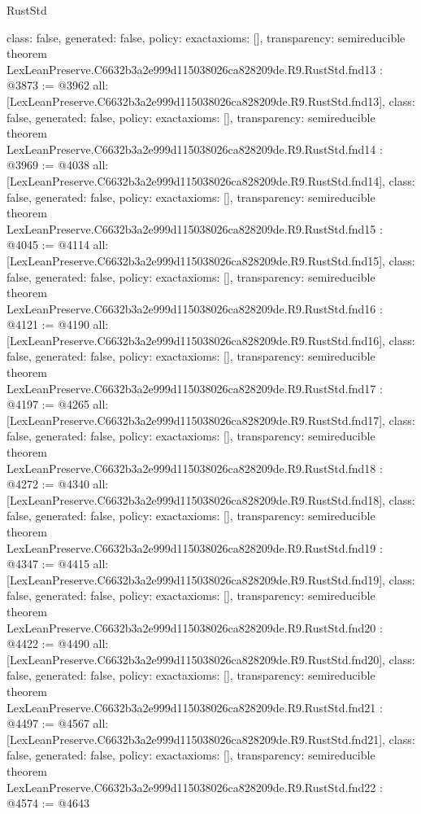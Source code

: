 \begin{lexlean}{RustStd}
\begin{coremodule}
{  class: false,
  generated: false,
  policy: exact{axioms: []},
  transparency: semireducible
}
theorem LexLeanPreserve.C6632b3a2e999d115038026ca828209de.R9.RustStd.fnd13 : @3873 := @3962 {
  all: [LexLeanPreserve.C6632b3a2e999d115038026ca828209de.R9.RustStd.fnd13],
  class: false,
  generated: false,
  policy: exact{axioms: []},
  transparency: semireducible
}
theorem LexLeanPreserve.C6632b3a2e999d115038026ca828209de.R9.RustStd.fnd14 : @3969 := @4038 {
  all: [LexLeanPreserve.C6632b3a2e999d115038026ca828209de.R9.RustStd.fnd14],
  class: false,
  generated: false,
  policy: exact{axioms: []},
  transparency: semireducible
}
theorem LexLeanPreserve.C6632b3a2e999d115038026ca828209de.R9.RustStd.fnd15 : @4045 := @4114 {
  all: [LexLeanPreserve.C6632b3a2e999d115038026ca828209de.R9.RustStd.fnd15],
  class: false,
  generated: false,
  policy: exact{axioms: []},
  transparency: semireducible
}
theorem LexLeanPreserve.C6632b3a2e999d115038026ca828209de.R9.RustStd.fnd16 : @4121 := @4190 {
  all: [LexLeanPreserve.C6632b3a2e999d115038026ca828209de.R9.RustStd.fnd16],
  class: false,
  generated: false,
  policy: exact{axioms: []},
  transparency: semireducible
}
theorem LexLeanPreserve.C6632b3a2e999d115038026ca828209de.R9.RustStd.fnd17 : @4197 := @4265 {
  all: [LexLeanPreserve.C6632b3a2e999d115038026ca828209de.R9.RustStd.fnd17],
  class: false,
  generated: false,
  policy: exact{axioms: []},
  transparency: semireducible
}
theorem LexLeanPreserve.C6632b3a2e999d115038026ca828209de.R9.RustStd.fnd18 : @4272 := @4340 {
  all: [LexLeanPreserve.C6632b3a2e999d115038026ca828209de.R9.RustStd.fnd18],
  class: false,
  generated: false,
  policy: exact{axioms: []},
  transparency: semireducible
}
theorem LexLeanPreserve.C6632b3a2e999d115038026ca828209de.R9.RustStd.fnd19 : @4347 := @4415 {
  all: [LexLeanPreserve.C6632b3a2e999d115038026ca828209de.R9.RustStd.fnd19],
  class: false,
  generated: false,
  policy: exact{axioms: []},
  transparency: semireducible
}
theorem LexLeanPreserve.C6632b3a2e999d115038026ca828209de.R9.RustStd.fnd20 : @4422 := @4490 {
  all: [LexLeanPreserve.C6632b3a2e999d115038026ca828209de.R9.RustStd.fnd20],
  class: false,
  generated: false,
  policy: exact{axioms: []},
  transparency: semireducible
}
theorem LexLeanPreserve.C6632b3a2e999d115038026ca828209de.R9.RustStd.fnd21 : @4497 := @4567 {
  all: [LexLeanPreserve.C6632b3a2e999d115038026ca828209de.R9.RustStd.fnd21],
  class: false,
  generated: false,
  policy: exact{axioms: []},
  transparency: semireducible
}
theorem LexLeanPreserve.C6632b3a2e999d115038026ca828209de.R9.RustStd.fnd22 : @4574 := @4643 {
}
\end{coremodule}
\end{lexlean}
